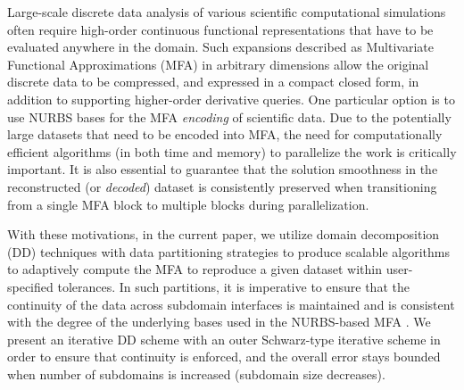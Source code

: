 \documentclass[conference]{IEEEtran}
\newcommand{\Remark}[1]{{\color{RED}\sf Remark: {#1}}}
\begin{document}
Large-scale discrete data analysis of various scientific computational simulations often require high-order continuous functional representations that have to be evaluated anywhere in the domain. Such expansions described as Multivariate Functional Approximations (MFA) \cite{de1983approximation} in arbitrary dimensions allow the original discrete data to be compressed, and expressed in a compact closed form, in addition to supporting higher-order derivative queries. One particular option is to use NURBS bases \cite{nurbs-book} for the MFA {\em encoding} of scientific data. Due to the potentially large datasets that need to be encoded into MFA, the need for computationally efficient algorithms (in both time and memory) to parallelize the work is critically important. It is also essential to guarantee that the solution smoothness in the reconstructed (or {\em decoded}) dataset is consistently preserved when transitioning from a single MFA block to multiple blocks during parallelization.

With these motivations, in the current paper, we utilize domain decomposition (DD) techniques \cite{smith-ddm} with data partitioning strategies to produce scalable algorithms to adaptively compute the MFA to reproduce a given dataset within user-specified tolerances. In such partitions, it is imperative to ensure that the continuity of the data across subdomain interfaces is maintained and is consistent with the degree of the underlying bases used in the NURBS-based MFA \cite{peterka-mfa}. 
We present an iterative DD scheme with an outer Schwarz-type iterative scheme in order to ensure that continuity is enforced, and the overall error stays bounded when number of subdomains is increased (subdomain size decreases). 


\end{document}
